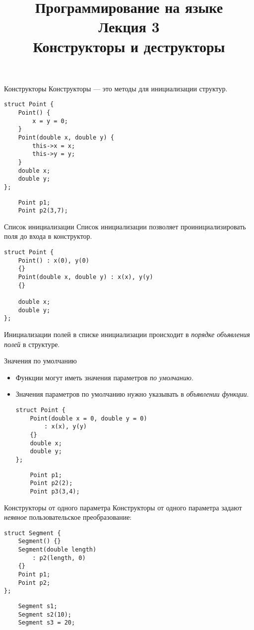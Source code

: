\documentclass{beamer}
\title{{\bf Программирование на языке \langcpp\protect\\Лекция
3\protect\vspace{1em}\\}Конструкторы и деструкторы}
\begin{document}
\begin{frame} 
  \titlepage
\end{frame}

\begin{frame}[fragile]{Конструкторы}
    Конструкторы — это методы для инициализации структур.
\begin{lstlisting}
struct Point {
    Point() { 
        x = y = 0;
    }
    Point(double x, double y) {
        this->x = x;
        this->y = y;
    }
    double x;
    double y;
};
\end{lstlisting}
\begin{lstlisting}
    Point p1;
    Point p2(3,7);
\end{lstlisting}
\end{frame}

\begin{frame}[fragile]{Список инициализации}
    Список инициализации позволяет проинициализировать поля до входа в
    конструктор.
\begin{lstlisting}
struct Point {
    Point() : x(0), y(0) 
    {}
    Point(double x, double y) : x(x), y(y) 
    {}

    double x;
    double y;
};
\end{lstlisting}
Инициализации полей в списке инициализации
происходит в {\em порядке объявления полей} в структуре.
\end{frame}

\begin{frame}[fragile]{Значения по умолчанию}
    \begin{itemize}
        \item Функции могут иметь значения параметров {\em по умолчанию}.
        \item Значения параметров по умолчанию нужно указывать в {\em объявлении
            функции}.
\begin{lstlisting}
struct Point {
    Point(double x = 0, double y = 0) 
        : x(x), y(y)
    {}
    double x;
    double y;
};
\end{lstlisting}
\begin{lstlisting}
    Point p1;
    Point p2(2);
    Point p3(3,4);
\end{lstlisting}
    \end{itemize}
\end{frame}

\begin{frame}[fragile]{Конструкторы от одного параметра}
    Конструкторы от одного параметра задают {\em неявное}
    пользовательское преобразование:
\begin{lstlisting}
struct Segment {
    Segment() {}
    Segment(double length) 
        : p2(length, 0)
    {}
    Point p1;
    Point p2;
};
\end{lstlisting}
\begin{lstlisting}
    Segment s1;
    Segment s2(10);
    Segment s3 = 20;
\end{lstlisting}
\end{frame}
\end{document}
